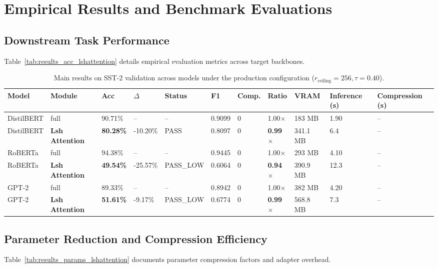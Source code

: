 \section{Empirical Results and Benchmark Evaluations}

\subsection{Downstream Task Performance}
Table~\ref{tab:results_acc_lshattention} details empirical evaluation metrics across target backbones.

\begin{table}[t]
\centering
\small
\begin{tabular}{lllllllllll}
\toprule
\textbf{Model} & \textbf{Module} & \textbf{Acc} & \textbf{$\Delta$} & \textbf{Status} & \textbf{F1} & \textbf{Comp.} & \textbf{Ratio} & \textbf{VRAM} & \textbf{Inference (s)} & \textbf{Compression (s)} \\
\midrule
DistilBERT & full & 90.71\% & -- & -- & 0.9099 & 0 & 1.00$\times$ & 183 MB & 1.90 & -- \\
DistilBERT & \textbf{Lsh Attention} & \textbf{80.28\%} & -10.20\% & PASS & 0.8097 & 0 & \textbf{0.99$\times$} & 341.1 MB & 6.4 & -- \\
RoBERTa & full & 94.38\% & -- & -- & 0.9445 & 0 & 1.00$\times$ & 293 MB & 4.10 & -- \\
RoBERTa & \textbf{Lsh Attention} & \textbf{49.54\%} & -25.57\% & PASS\_LOW & 0.6064 & 0 & \textbf{0.94$\times$} & 390.9 MB & 12.3 & -- \\
GPT-2 & full & 89.33\% & -- & -- & 0.8942 & 0 & 1.00$\times$ & 382 MB & 4.20 & -- \\
GPT-2 & \textbf{Lsh Attention} & \textbf{51.61\%} & -9.17\% & PASS\_LOW & 0.6774 & 0 & \textbf{0.99$\times$} & 568.8 MB & 7.3 & -- \\
\bottomrule
\end{tabular}
\caption{Main results on SST-2 validation across models under the production configuration ($r_{\mathrm{ceiling}}=256, \tau=0.40$).}
\label{tab:main_sst2}
\end{table}

\subsection{Parameter Reduction and Compression Efficiency}
Table~\ref{tab:results_params_lshattention} documents parameter compression factors and adapter overhead.

